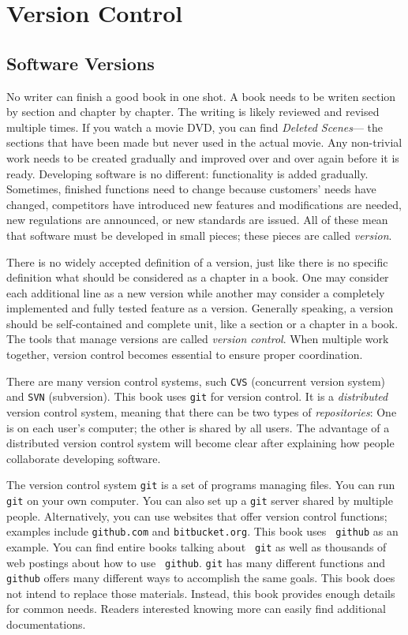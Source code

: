 \chapter{Version Control}

\section{Software Versions}

No writer can finish a good book in one shot. A book needs to be
writen section by section and chapter by chapter. The writing is
likely reviewed and revised multiple times. If you watch a movie DVD,
you can find {\it Deleted Scenes}--- the sections that have been made
but never used in the actual movie.  Any non-trivial work needs to be
created gradually and improved over and over again before it is ready.
Developing software is no different: functionality is added
gradually. Sometimes, finished functions need to change because
customers' needs have changed, competitors have introduced new
features and modifications are needed, new regulations are announced,
or new standards are issued. All of these mean that software must be
developed in small pieces; these pieces are called {\it version}.

There is no widely accepted definition of a version, just like there
is no specific definition what should be considered as a chapter in a
book. One may consider each additional line as a new version while
another may consider a completely implemented and fully tested feature
as a version. Generally speaking, a version should be self-contained
and complete unit, like a section or a chapter in a book.  The tools
that manage versions are called {\it version control}.  When multiple
work together, version control becomes essential to ensure proper
coordination.

There are many version control systems, such {\tt CVS} (concurrent
version system) and {\tt SVN} (subversion).  This book uses {\tt git}
for version control. It is a {\it distributed} version control system,
meaning that there can be two types of {\it repositories}: One is on
each user's computer; the other is shared by all users. The advantage
of a distributed version control system will become clear after
explaining how people collaborate developing software.

The version control system {\tt git} is a set of programs managing
files.  You can run {\tt git} on your own computer. You can also set
up a {\tt git} server shared by multiple people. Alternatively, you
can use websites that offer version control functions; examples
include {\tt github.com} and {\tt bitbucket.org}.  This book uses {\tt
  github} as an example.  You can find entire books talking about {\tt
  git} as well as thousands of web postings about how to use {\tt
  github}. {\tt git} has many different functions and {\tt github}
offers many different ways to accomplish the same goals.  This book
does not intend to replace those materials.  Instead, this book
provides enough details for common needs.  Readers interested knowing
more can easily find additional documentations.

